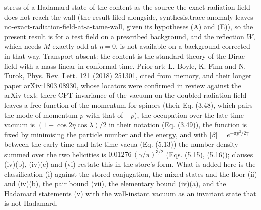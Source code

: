 stress of a Hadamard state of the content as the source the exact radiation field does not reach the wall (the result filed alongside, synthesis.trace-anomaly-leaves-no-exact-radiation-field-at-a-tame-wall, given its hypotheses (A) and (E)), so the present result is for a test field on a prescribed background, and the reflection $W$, which needs $M$ exactly odd at $\eta = 0$, is not available on a background corrected in that way. Transport-absent: the content is the standard theory of the Dirac field with a mass linear in conformal time. Prior art: L. Boyle, K. Finn and N. Turok, Phys. Rev. Lett. 121 (2018) 251301, cited from memory, and their longer paper arXiv:1803.08930, whose locators were confirmed in review against the arXiv text: there CPT invariance of the vacuum on the doubled radiation field leaves a free function of the momentum for spinors (their Eq. (3.48), which pairs the mode of momentum $p$ with that of $-p$), the occupation over the late-time vacuum is $(1 - \cos 2\eta\cos\lambda)/2$ in their notation (Eq. (3.49)), the function is fixed by minimising the particle number and the energy, and with $|\beta| = e^{-\pi p^{2}/2\gamma}$ between the early-time and late-time vacua (Eq. (5.13)) the number density summed over the two helicities is $0.01276\,(\gamma/\pi)^{3/2}$ (Eqs. (5.15), (5.16)); clauses (iv)(b), (iv)(c) and (vi) restate this in the store's form. What is added here is the classification (i) against the stored conjugation, the mixed states and the floor (ii) and (iv)(b), the pair bound (vii), the elementary bound (iv)(a), and the Hadamard statements (v) with the wall-instant vacuum as an invariant state that is not Hadamard.
